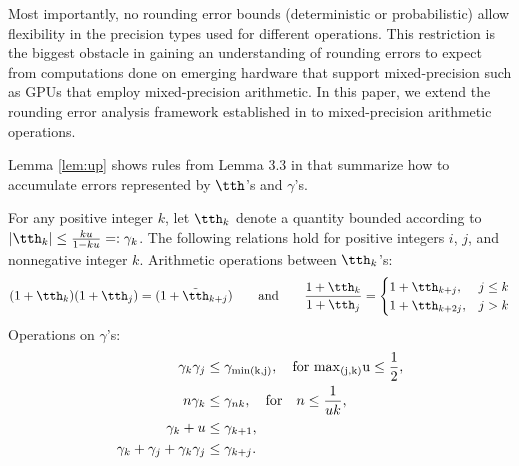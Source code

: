 Most importantly, no rounding error bounds (deterministic or probabilistic) allow flexibility in the precision types used for different operations. 
This restriction is the biggest obstacle in gaining an understanding of rounding errors to expect from computations done on emerging hardware that support mixed-precision such as GPUs that employ mixed-precision arithmetic.
In this paper, we extend the rounding error analysis framework established in \cite{Higham2002} to mixed-precision arithmetic operations. 




Lemma \ref{lem:up} shows rules from Lemma 3.3 in \cite{Higham2002} that summarize how to accumulate errors represented by $\tth$'s and $\gamma$'s.
\begin{lemma}
	\label{lem:up}
	For any positive integer $k$, let $\tth_{k}$ denote a quantity bounded according to $|\tth_{k}|\leq \frac{k u }{1-ku} =:\gamma_{k}$. The following relations hold for positive integers $i$, $j$, and nonnegative integer $k$.
	Arithmetic operations between $\tth_{k}$'s: 
	\begin{equation}
	(1+\tth_{k})(1+\tth_{j})%
	=(1+\tilde{\tth}_{k+j}) %
	\qquad \mbox{and} \qquad
	\frac{1+\tth_{k}}{1+\tth_{j}} %
	=
	\begin{cases}
	1+\tth_{k+j},& j \leq k\\
	1+\tth_{k+2j},& j > k\\
	\end{cases} 
	\end{equation}
	Operations on $\gamma$'s: 
	\begin{align*}
	\gamma_{k}\gamma_{j} &\leq \gamma_{\rm{min}(k,j)}, \quad\text{for } \rm{max}_{(j,k)} u \leq \frac{1}{2}, \\
	n\gamma_{k} &\leq \gamma_{nk}, \quad \mbox{for} \quad n \leq \frac{1}{uk},\\
	\gamma_{k} + u &\leq \gamma_{k+1}, \\ 
	\gamma_{k}+\gamma_{j}+\gamma_{k}\gamma_{j} & \leq \gamma_{k+j}.
	\end{align*}
\end{lemma}

